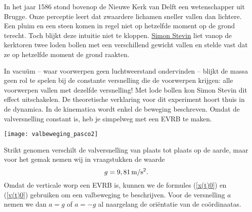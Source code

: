 \documentclass{ximera}
\begin{document}
	\author{Bart Lambregs}
    \xmsource



 In het jaar 1586 stond bovenop de Nieuwe Kerk van Delft een wetenschapper uit Brugge. Onze perceptie leert dat zwaardere lichamen sneller vallen dan lichtere. Een pluim en een steen komen in regel niet op hetzelfde moment op de grond terecht. Toch blijkt deze intuitie niet te kloppen. \href{https://www.canonvanvlaanderen.be/events/simon-stevin/}{Simon Stevin} liet vanop de kerktoren twee loden bollen met een verschillend gewicht vallen en stelde vast dat ze op hetzelfde moment de grond raakten. 
	

In vacu\"um -- waar voorwerpen geen luchtweerstand ondervinden -- blijkt de massa geen rol te spelen bij de constante versnelling die de voorwerpen krijgen: alle voorwerpen vallen met dezelfde versnelling! Met lode bollen kon Simon Stevin dit effect uitschakelen. De theoretische verklaring voor dit experiment hoort thuis in de dynamica. In de kinematica wordt enkel de beweging beschreven. Omdat de valversnelling constant is, heb je simpelweg met een EVRB te maken.

\begin{image}

\texttt{[image: valbeweging\_pasco2]}
\end{image}
Strikt genomen verschilt de valversnelling van plaats tot plaats op de aarde, maar voor het gemak nemen wij in vraagstukken de waarde
\[g=9,81\rm\,m/s^2.\]
Omdat de verticale worp een EVRB is, kunnen we de formules (\ref{x(t)0}) en (\ref{v(t)0}) gebruiken om een valbeweging te beschrijven. Voor de versnelling $a$ nemen we dan $a=g$ of $a=-g$ al naargelang de oriëntatie van de coördinaatas.

\clearpage
\end{document}
